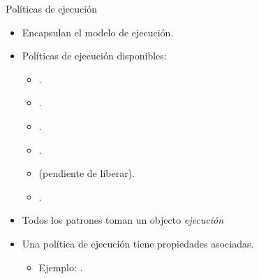 \begin{frame}[t]{Políticas de ejecución}
\begin{itemize}
  \item Encapsulan el modelo de ejecución.
  \vfill
  \item Políticas de ejecución disponibles:
    \begin{itemize}
      \item {}.
      \item {}.
      \item {}.
      \item {}.
      \item {} (pendiente de liberar).
      \item {}.
    \end{itemize}
  \vfill
  \item Todos los patrones toman un objecto \emph{ejecución}
  \vfill
  \item Una política de ejecución tiene propiedades asociadas.
    \begin{itemize}
      \item Ejemplo: .
    \end{itemize}
\end{itemize}
\end{frame}
